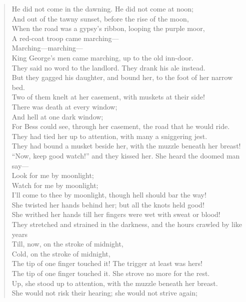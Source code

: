 \begin{verse}
He did not come in the dawning. He did not come at noon;\\
And out of the tawny sunset, before the rise of the moon,\\
When the road was a gypsy's ribbon, looping the purple moor,\\
A red-coat troop came marching---\\
Marching---marching---\\
King George's men came marching, up to the old inn-door.\\
They said no word to the landlord. They drank his ale instead.\\
But they gagged his daughter, and bound her, to the foot of her narrow bed.\\
Two of them knelt at her casement, with muskets at their side!\\
There was death at every window;\\
And hell at one dark window;\\
For Bess could see, through her casement, the road that he would ride.\\
They had tied her up to attention, with many a sniggering jest.\\
They had bound a musket beside her, with the muzzle beneath her breast!\\
``Now, keep good watch!'' and they kissed her. She heard the doomed man say---\\
Look for me by moonlight;\\
Watch for me by moonlight;\\
I'll come to thee by moonlight, though hell should bar the way!\\
She twisted her hands behind her; but all the knots held good!\\
She writhed her hands till her fingers were wet with sweat or blood!\\
They stretched and strained in the darkness, and the hours crawled by like years\\
Till, now, on the stroke of midnight,\\
Cold, on the stroke of midnight,\\
The tip of one finger touched it! The trigger at least was hers!\\
The tip of one finger touched it. She strove no more for the rest.\\
Up, she stood up to attention, with the muzzle beneath her breast.\\
She would not risk their hearing; she would not strive again;\\

\end{verse}
